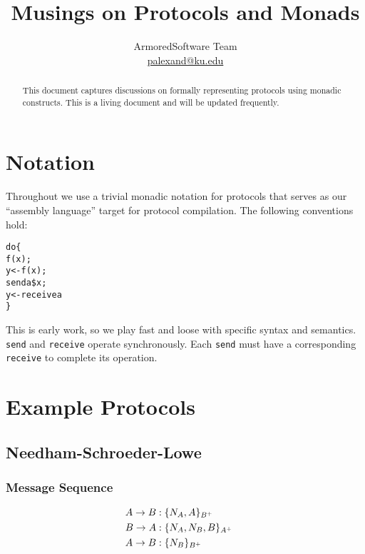 \documentclass[10pt]{article}
\title{Musings on Protocols and Monads}
\author{ArmoredSoftware Team \\
 \url{palexand@ku.edu}}
\begin{document}
\maketitle

\begin{abstract}
  This document captures discussions on formally representing
  protocols using monadic constructs.  This is a living document and
  will be updated frequently.
\end{abstract}

\section*{Notation}

Throughout we use a trivial monadic notation for protocols that serves
as our ``assembly language'' target for protocol compilation.
The following conventions hold:

\begin{alltt}
  do \{                % evaluate functions in sequence
       f(x);          % calculate f(x) and discard the result
       y <- f(x);     % calculate f(x) and bind the result to y
       send a \$ x;    % evaluate x and send the result to a
       y <- receive a % receive data from a and the result to y
  \}
\end{alltt}

This is early work, so we play fast and loose with specific syntax and
semantics.  \Verb+send+ and \Verb+receive+ operate synchronously.
Each \Verb+send+ must have a corresponding \Verb+receive+ to complete
its operation.

\section*{Example Protocols}

\subsection*{Needham-Schroeder-Lowe}

\subsubsection*{Message Sequence}
\begin{align*}
& A\rightarrow B:\{N_{A}, A\}_{B^{+}} \; & \\
& B\rightarrow A:\{N_{A}, N_{B}, B\}_{A^{+}}\; & \\
& A\rightarrow B:\{N_{B}\}_{B^{+}}\; & \\
\end{align*}
\end{document}
